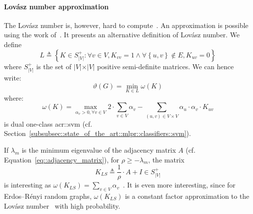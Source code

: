             \paragraph{Lov\'asz number approximation}
                The Lov\'asz number is, however, hard to compute~\parencite{johansson2014global}.
                An approximation is possible using the work of~\textcite{jethava2013lovasz}.
                It presents an alternative definition of Lov\'asz number.
                We define $$L \triangleq \left\{K \in S_{\vert V \vert}^+: \forall v \in V, K_{vv} = 1 \wedge \forall \left\{u, v\right\}  \notin E, K_{uv} = 0\right\}$$ where $S_{\vert V \vert}^+$ is the set of $\vert V \vert \times \vert V \vert$ positive semi-definite matrices.
                We can hence write:
                \begin{equation}
                    \label{eq::lovazs_number_alternative}
                    \vartheta(G) = \min_{K \in L} \omega(K)
                \end{equation}
                where:
                \begin{equation}
                    \omega(K) = \max_{\alpha_v > 0, \forall v \in V} 2\cdot \sum_{v\in V} \alpha_v - \sum_{(u, v) \in V\times V} \alpha_u \cdot \alpha_v \cdot K_{uv}
                \end{equation}
                is dual one-class \gls{acr::svm} (cf. Section~\ref{subsubsec::state_of_the_art::mlpr::classifiers::svm}).

                If $\lambda_m$ is the minimum eigenvalue of the adjacency matrix $A$ (cf. Equation~\ref{eq::adjacency_matrix}), for $\rho\geq-\lambda_m$, the matrix
                \begin{equation}
                    \label{eq::ls_matrix}
                    K_{LS} \triangleq \frac{1}{\rho} \cdot A + I \in S_{\vert V \vert}^+
                \end{equation}
                is interesting as $\omega(K_{LS}) = \sum_{v\in V} \alpha_v$~\parencite{jethava2013lovasz}.
                It is even more interesting, since for Erdos–R\'enyi random graphs, $\omega(K_{LS})$ is a constant factor approximation to the Lov\'asz number~\parencite{jethava2013lovasz} with high probability.

